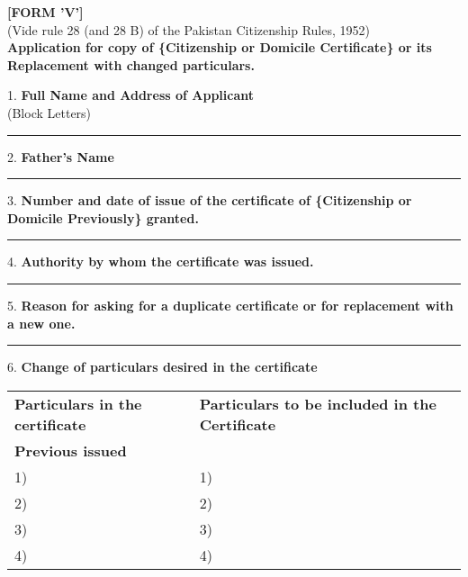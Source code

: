 \documentclass{article}
\begin{document}
\centering
\textbf{[FORM 'V']} \\
(Vide rule 28 (and 28 B) of the Pakistan Citizenship Rules, 1952) \\
\textbf{Application for copy of \{Citizenship or Domicile Certificate\} or its Replacement with changed particulars.}

\vspace{0.5cm}

1. \textbf{Full Name and Address of Applicant} \\
(Block Letters) \hspace{5cm} \rule{5cm}{0.4pt}

\vspace{0.5cm}

2. \textbf{Father's Name} \hspace{6cm} \rule{5cm}{0.4pt}

\vspace{0.5cm}

3. \textbf{Number and date of issue of the certificate of \{Citizenship or Domicile Previously\} granted.} \hspace{1cm} \rule{5cm}{0.4pt}

\vspace{0.5cm}

4. \textbf{Authority by whom the certificate was issued.} \hspace{3cm} \rule{5cm}{0.4pt}

\vspace{0.5cm}

5. \textbf{Reason for asking for a duplicate certificate or for replacement with a new one.} \hspace{1cm} \rule{5cm}{0.4pt}

\vspace{0.5cm}

6. \textbf{Change of particulars desired in the certificate}

\vspace{0.5cm}

\begin{tabular}{ll}
\textbf{Particulars in the certificate} & \textbf{Particulars to be included in the Certificate} \\
\textbf{Previous issued} & \\
1) \hspace{5cm} & 1) \hspace{5cm} \\
2) \hspace{5cm} & 2) \hspace{5cm} \\
3) \hspace{5cm} & 3) \hspace{5cm} \\
4) \hspace{5cm} & 4) \hspace{5cm} \\
\end{tabular}
\end{document}
